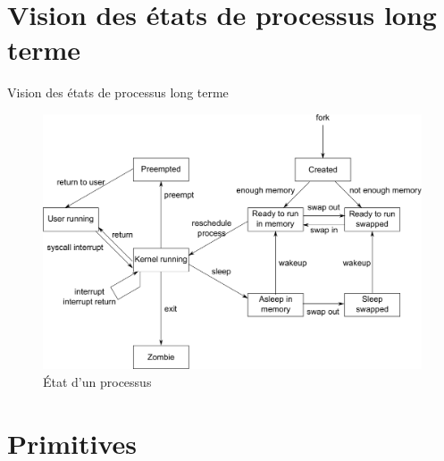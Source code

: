 \def\sectitle{Vision des états de processus long terme}
\section{\sectitle}
\begin{frame}{\sectitle}
\begin{figure}
\includegraphics[width=.9\textwidth]{images/StateFull.pdf}
\caption{État d'un processus}
\end{figure}
\end{frame}



\def\sectitle{Primitives}
\section{\sectitle}

